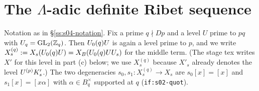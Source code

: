 \section{The \texorpdfstring{$\Lambda$}{Lambda}-adic definite Ribet sequence}

Notation as in \S\ref{ss:s04-notation}. Fix a prime $q\nmid Dp$ and a level $U$ prime to $pq$ with $U_q=\mathrm{GL}_2(\mathbb{Z}_q)$. Then
$U_0(q)U$ is again a level prime to $p$, and we write $X^{(q)}_s:=X_s(U_0(q)U)=X_B(U_0(q)UU_s)$ for the middle term. (The stage
tex writes $X'$ for this level in part (c) below; we use $X^{(q)}_s$ because $X'_s$ already denotes the level $U^{(p)}K'_{s}$.) The two
degeneracies $s_0,s_1:X^{(q)}_s\to X_s$ are $s_0[x]=[x]$ and $s_1[x]=[x\alpha]$ with $\alpha\in B_q^\times$ supported at $q$
(\texttt{if:s02-quot}).

